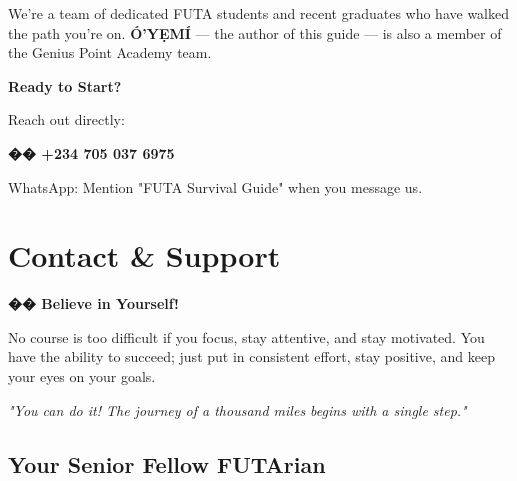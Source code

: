 \documentclass[11pt,a4paper]{article}
\newcommand{\quotetext}[1]{\begin{quotebox}\itshape\color{primary}#1\end{quotebox}}
\begin{document}
\begin{gpabox}
    \vspace{0.7em}

    {\color{white}We're a team of dedicated FUTA students and recent graduates who have walked the path you're on. \textbf{Ó'YẸMÍ} --- the author of this guide --- is also a member of the Genius Point Academy team.}

    \vspace{0.5em}

    {\color{accent}\large\bfseries Ready to Start?}

    \vspace{0.3em}

    {\color{white}Reach out directly:}

    \vspace{0.3em}

    {\color{accent}\textbf{\Large �� +234 705 037 6975}}

    \vspace{0.3em}

    {\color{white}\small WhatsApp: Mention "FUTA Survival Guide" when you message us.}
\end{gpabox}

\newpage
\section{Contact \& Support}

\begin{inspirational}
    \textbf{\color{primary}\Large �� Believe in Yourself!}

    \vspace{0.5em}

    No course is too difficult if you focus, stay attentive, and stay motivated. You have the ability to succeed; just put in consistent effort, stay positive, and keep your eyes on your goals.

    \vspace{0.5em}

    \quotetext{"You can do it! The journey of a thousand miles begins with a single step."}
\end{inspirational}

\subsection*{Your Senior Fellow FUTArian}
\end{document}
